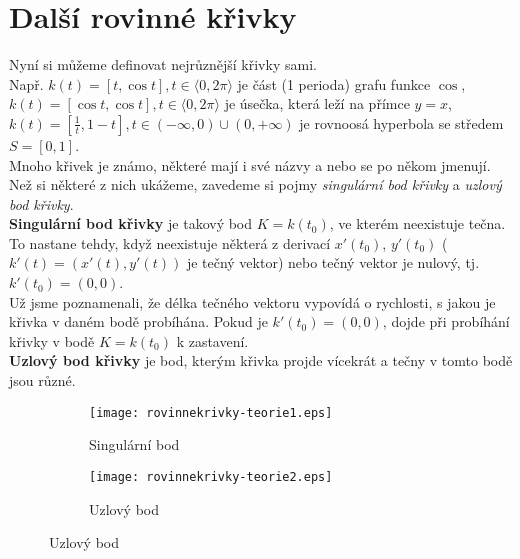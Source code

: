 \chapter{Další rovinné křivky}
Nyní si můžeme definovat nejrůznější křivky sami. \\
Např. $k(t)=[t, \cos{t}], t \in \langle0, 2\pi\rangle$ je část (1 perioda) grafu funkce $\cos$,  \\
$k(t)=[\cos{t}, \cos{t}], t \in \langle0, 2\pi\rangle$ je úsečka, která leží na přímce $y=x$, \\
$k(t)=\left[\frac{1}{t}, 1-t\right], t \in (-\infty, 0) \cup (0, +\infty)$ je rovnoosá hyperbola se středem $S=[0,1]$. \\[10pt]
	Mnoho křivek je známo, některé mají i své názvy a nebo se po někom jmenují. Než si některé z nich ukážeme, zavedeme si pojmy
	\textit{singulární bod křivky} a \textit{uzlový bod křivky}. \\[10pt]
	\textbf{Singulární bod křivky} je takový bod $K=k(t_0)$, ve kterém neexistuje tečna. To nastane tehdy, když neexistuje některá
	z derivací $x'(t_0)$, $y'(t_0)$ ($k'(t)=(x'(t), y'(t))$ je tečný vektor) nebo tečný vektor je nulový, tj. $k'(t_0)=(0,0)$. \\
	Už jsme poznamenali, že délka tečného vektoru vypovídá o rychlosti, s jakou je křivka v daném bodě probíhána. Pokud je $k'(t_0)=(0,0)$,
	dojde při probíhání křivky v bodě $K=k(t_0)$ k zastavení. \\[5pt]
	\textbf{Uzlový bod křivky} je bod, kterým křivka projde vícekrát a tečny v tomto bodě jsou různé.
	\begin{figure}[H]
		\centering
		\begin{subfigure}[b]{0.4\textwidth}
			\texttt{[image: rovinnekrivky-teorie1.eps]}
			\caption{Singulární bod}
		\end{subfigure}%
		\quad
		\begin{subfigure}[b]{0.4\textwidth}
			\texttt{[image: rovinnekrivky-teorie2.eps]}
			\caption{Uzlový bod}
		\end{subfigure}%
	\end{figure}
	\clearpage
